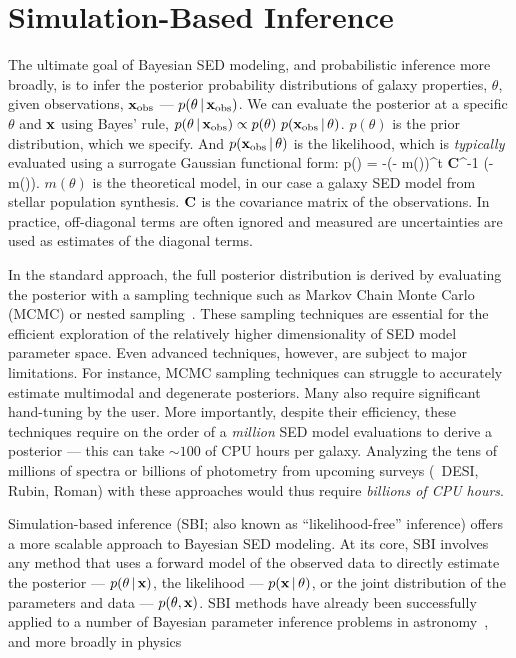 \section{Simulation-Based Inference} \label{sec:sbi}
The ultimate goal of Bayesian SED modeling, and probabilistic inference more
broadly, is to infer the posterior probability distributions of galaxy
properties, $\theta$, given observations, ${\bf x}_{\rm obs}$  --- $p(\theta\,|\,{\bf x}_{\rm obs})$.
We can evaluate the posterior at a specific $\theta$ and ${\bf x}$ using
Bayes' rule, $p(\theta\,|\,{\bf x}_{\rm obs}) \propto p(\theta)~p({\bf x}_{\rm obs}\,|\,\theta)$. 
$p(\theta)$ is the prior distribution, which we specify. 
And $p({\bf x}_{\rm obs}\,|\,\theta)$ is the likelihood, which is {\em typically}
evaluated using a surrogate Gaussian functional form: 
\beq
    \ln p(\xobs\given\theta) = -(\xobs - m(\theta))^t {\bf C}^{-1}
    (\xobs - m(\theta)).
\eeq
$m(\theta)$ is the theoretical model, in our case a galaxy SED model from
stellar population synthesis.
${\bf C}$ is the covariance matrix of the observations. 
In practice, off-diagonal terms are often ignored and measured are
uncertainties are used as estimates of the diagonal terms. 

In the standard approach, the full posterior distribution is derived by
evaluating the posterior with a sampling technique such as Markov Chain Monte
Carlo (MCMC) or nested sampling~\citep[\eg][]{carnall2017, leja2019a,
tacchella2021}.
These sampling techniques are essential for the efficient exploration of
the relatively higher dimensionality of SED model parameter space.
Even advanced techniques, however, are subject to major limitations.  
For instance, MCMC sampling techniques can struggle to accurately estimate
multimodal and degenerate posteriors. 
Many also require significant hand-tuning by the user.
More importantly, despite their efficiency, these techniques require on the
order of a {\em million} SED model evaluations to derive a posterior --- this
can take ${\sim}100$ of CPU hours per galaxy.
Analyzing the tens of millions of spectra or billions of photometry from
upcoming surveys (\eg~DESI, Rubin, Roman) with these approaches would thus
require {\em billions of CPU hours}.

Simulation-based inference (SBI; also known as ``likelihood-free'' inference)
offers a more scalable approach to Bayesian SED modeling.
At its core, SBI involves any method that uses a forward model of the observed
data to directly estimate the posterior --- $p(\theta\,|\, {\bf x})$, the
likelihood --- $p({\bf x}\,|\, \theta)$, or the joint distribution of the
parameters and data --- $p(\theta, {\bf x})$. 
SBI methods have already been successfully applied to a number of Bayesian
parameter inference problems in astronomy~\citep[\emph{e.g.}][]{cameron2012, 
weyant2013, hahn2017b, kacprzak2018, alsing2018, wong2020, huppenkothen2021,
zhang2021}, and more broadly in physics~\citep[\emph{e.g.}][]{brehmer2019,
cranmer2020}

